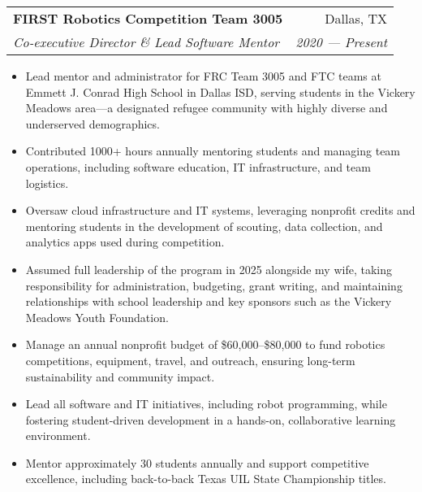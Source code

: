 \documentclass[11pt, a4paper]{article}
\makeatletter
\newcommand{\resumeItem}[1]{%
  \item\small{
    #1
  }
}
\newcommand{\resumeSubheading}[4]{
  \vspace{8pt}\item%
    \begin{tabular*}{0.97\textwidth}[t]{l@{\extracolsep{\fill}}r}
      \textbf{#1} & #2 \\
      \textit{\small#3} & \textit{\small #4} \\
    \end{tabular*}\vspace{-5pt}
}
\newcommand{\resumeItemListStart}{\begin{itemize}}
\newcommand{\resumeItemListEnd}{\end{itemize}\vspace{-5pt}}
\makeatother
\begin{document}
    \resumeSubheading
      {FIRST Robotics Competition Team 3005}{Dallas, TX}
      {Co-executive Director \& Lead Software Mentor}{2020 — Present}
      \resumeItemListStart
        \resumeItem{Lead mentor and administrator for FRC Team 3005 and FTC teams at Emmett J. Conrad High School in Dallas ISD, serving students in the Vickery Meadows area—a designated refugee community with highly diverse and underserved demographics.}
        \resumeItem{Contributed 1000+ hours annually mentoring students and managing team operations, including software education, IT infrastructure, and team logistics.}
        \resumeItem{Oversaw cloud infrastructure and IT systems, leveraging nonprofit credits and mentoring students in the development of scouting, data collection, and analytics apps used during competition.}
        \resumeItem{Assumed full leadership of the program in 2025 alongside my wife, taking responsibility for administration, budgeting, grant writing, and maintaining relationships with school leadership and key sponsors such as the Vickery Meadows Youth Foundation.}
        \resumeItem{Manage an annual nonprofit budget of \$60,000–\$80,000 to fund robotics competitions, equipment, travel, and outreach, ensuring long-term sustainability and community impact.}
        \resumeItem{Lead all software and IT initiatives, including robot programming, while fostering student-driven development in a hands-on, collaborative learning environment.}
        \resumeItem{Mentor approximately 30 students annually and support competitive excellence, including back-to-back Texas UIL State Championship titles.}
    \resumeItemListEnd
\end{document}
